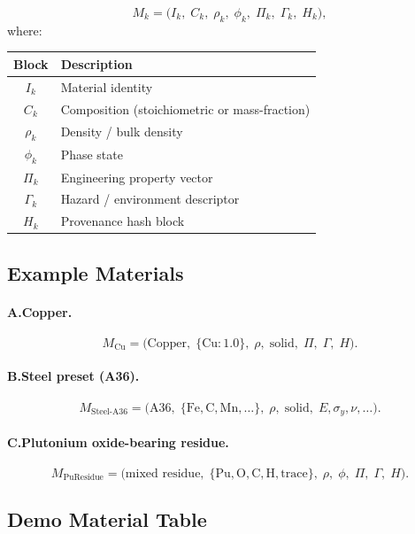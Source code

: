 \documentclass[11pt, a4paper, oneside]{article}
\begin{document}
\begin{equation}
\label{eq:material_record}
M_k = \bigl(I_k,\; C_k,\; \rho_k,\; \phi_k,\; \Pi_k,\; \Gamma_k,\; H_k\bigr),
\end{equation}
where:
\begin{center}
\begin{tabular}{@{} cl @{}}
\toprule
\textbf{Block} & \textbf{Description}\\
\midrule
$I_k$        & Material identity\\
$C_k$        & Composition (stoichiometric or mass-fraction)\\
$\rho_k$     & Density / bulk density\\
$\phi_k$     & Phase state\\
$\Pi_k$      & Engineering property vector\\
$\Gamma_k$   & Hazard / environment descriptor\\
$H_k$        & Provenance hash block\\
\bottomrule
\end{tabular}
\end{center}

\subsection{Example Materials}

\paragraph{A.\;Copper.}
\[
M_{\text{Cu}} = \bigl(\text{Copper},\;\{\text{Cu}{:}1.0\},\;
  \rho,\;\text{solid},\;\Pi,\;\Gamma,\;H\bigr).
\]

\paragraph{B.\;Steel preset (A36).}
\[
M_{\text{Steel-A36}} = \bigl(\text{A36},\;\{\text{Fe},\text{C},\text{Mn},\ldots\},\;
  \rho,\;\text{solid},\;E,\sigma_y,\nu,\ldots\bigr).
\]

\paragraph{C.\;Plutonium oxide-bearing residue.}
\[
M_{\text{PuResidue}} = \bigl(\text{mixed residue},\;
  \{\text{Pu},\text{O},\text{C},\text{H},\text{trace}\},\;
  \rho,\;\phi,\;\Pi,\;\Gamma,\;H\bigr).
\]

\subsection{Demo Material Table}
\end{document}
